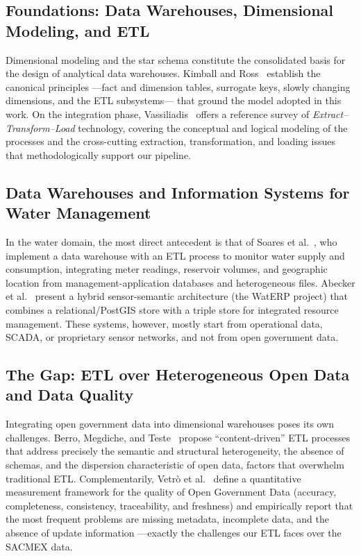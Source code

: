 \documentclass[runningheads]{llncs}
\renewcommand{\_}{\origunderscore\allowbreak}
\begin{document}
\subsection{Foundations: Data Warehouses, Dimensional Modeling, and ETL}

Dimensional modeling and the star schema constitute the consolidated basis for the design of analytical data warehouses. Kimball and Ross~\cite{kimball} establish the canonical principles ---fact and dimension tables, surrogate keys, slowly changing dimensions, and the ETL subsystems--- that ground the model adopted in this work. On the integration phase, Vassiliadis~\cite{vassiliadis2009} offers a reference survey of \emph{Extract--Transform--Load} technology, covering the conceptual and logical modeling of the processes and the cross-cutting extraction, transformation, and loading issues that methodologically support our pipeline.

\subsection{Data Warehouses and Information Systems for Water Management}

In the water domain, the most direct antecedent is that of Soares et al.~\cite{soares2019}, who implement a data warehouse with an ETL process to monitor water supply and consumption, integrating meter readings, reservoir volumes, and geographic location from management-application databases and heterogeneous files. Abecker et al.~\cite{abecker2014} present a hybrid sensor-semantic architecture (the WatERP project) that combines a relational/PostGIS store with a triple store for integrated resource management. These systems, however, mostly start from operational data, SCADA, or proprietary sensor networks, and not from open government data.

\subsection{The Gap: ETL over Heterogeneous Open Data and Data Quality}

Integrating open government data into dimensional warehouses poses its own challenges. Berro, Megdiche, and Teste~\cite{berro2015} propose ``content-driven'' ETL processes that address precisely the semantic and structural heterogeneity, the absence of schemas, and the dispersion characteristic of open data, factors that overwhelm traditional ETL. Complementarily, Vetr\`o et al.~\cite{vetro2016} define a quantitative measurement framework for the quality of Open Government Data (accuracy, completeness, consistency, traceability, and freshness) and empirically report that the most frequent problems are missing metadata, incomplete data, and the absence of update information ---exactly the challenges our ETL faces over the SACMEX data.
\end{document}
